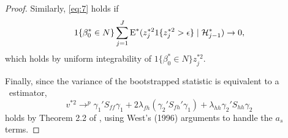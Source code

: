 \documentclass[12pt,fleqn]{article}
\begin{document}
\begin{proof}
   Similarly, \eqref{eq:7} holds if
   \begin{equation*}
     1\{\beta_0^* \in N\} \sum_{j=1}^J \operatorname{E}^*(z_j^{*2} 1\{z_j^{*2} > \epsilon\} \mid \mathcal{H}_{j-1}^*) \to 0,
   \end{equation*}
   which holds by uniform integrability of $1\{\beta_0^* \in N\} z_j^{*2}$.

   Finally, since the variance of the bootstrapped statistic is
   equivalent to a \hac\ estimator,
   \begin{equation*}
     v^{*2} \to^p \gamma_1' S_{ff} \gamma_1 + 2 \lambda_{fh} (\gamma_2' S_{fh}' \gamma_1)
     + \lambda_{hh} \gamma_2' S_{hh} \gamma_2
   \end{equation*}
   holds by Theorem 2.2 of \cite{JoD:00}, using West's (1996)
   arguments to handle the $a_s$ terms.
\end{proof}


\end{document}

